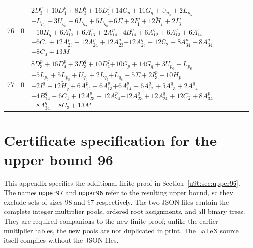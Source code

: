 \documentclass[11pt,a4paper]{article}
\theoremstyle{remark}
\begin{document}
\begin{longtable}{rrp{12.7cm}}
76&0&\( 2D_3^p + 10D_4^p + 8D_3^q + 16D_4^q \)\newline\( + 14G_p + 10G_q + U_{p_{0}} + 2L_{p_{5}} \)\newline\( + L_{p_{8}} + 3U_{q_{0}} + 6L_{q_{7}} + 5L_{q_{8}} \)\newline\( + 6\Sigma + 2I_1^p + 12\widetilde H_p + 2I_3^q \)\newline\( + 10\widetilde H_q + 6A_{12}^p + 6A_{13}^p + 2A_{14}^p \)\newline\( + 4B_{14}^p + 6A_{12}^q + 6A_{13}^q + 6A_{14}^q \)\newline\( + 6C_1 + 12A_{23}^p + 12A_{24}^p + 12A_{23}^q \)\newline\( + 12A_{24}^q + 12C_2 + 8A_{34}^p + 8A_{34}^q \)\newline\( + 8C_3 + 13M \)\\[3pt]
77&0&\( 8D_3^p + 16D_4^p + 3D_3^q + 10D_4^q \)\newline\( + 10G_p + 14G_q + 3U_{p_{0}} + L_{p_{6}} \)\newline\( + 5L_{p_{7}} + 5L_{p_{8}} + U_{q_{0}} + 2L_{q_{5}} \)\newline\( + L_{q_{8}} + 5\Sigma + 2I_3^p + 10\widetilde H_p \)\newline\( + 2I_1^q + 12\widetilde H_q + 6A_{12}^p + 6A_{13}^p \)\newline\( + 6A_{14}^p + 6A_{12}^q + 6A_{13}^q + 2A_{14}^q \)\newline\( + 4B_{14}^q + 6C_1 + 12A_{23}^p + 12A_{24}^p \)\newline\( + 12A_{23}^q + 12A_{24}^q + 12C_2 + 8A_{34}^p \)\newline\( + 8A_{34}^q + 8C_3 + 13M \)\\[3pt]
\end{longtable}
\endgroup

\section[Certificate specification for upper bound 96]{Certificate specification for the upper bound 96}\label{u96:app:upper96}
This appendix specifies the additional finite proof in
Section~\ref{u96:sec:upper96}. The names \texttt{upper97} and
\texttt{upper96} refer to the resulting upper bound, so they exclude
sets of sizes 98 and 97 respectively. The two JSON files contain the
complete integer multiplier pools, ordered root assignments, and all
binary trees. They are required companions to the new finite proof;
unlike the earlier multiplier tables, the new pools are not duplicated
in print. The LaTeX source itself compiles without the JSON files.
\end{document}
